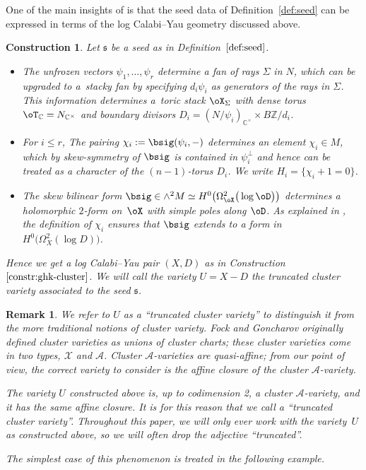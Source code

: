 \documentclass[10pt,a4paper]{amsart}
\numberwithin{equation}{section}
\newtheorem{Construction}[Theorem]{Construction}
\newtheorem{Remark}[Theorem]{Remark} }
\def\CC{\mathbb{C}}
\def\ZZ{\mathbb{Z}}
\newcommand\frs{\mathfrak{s}}
\begin{document}
One of the main insights of \cite{GHK2} is that the seed data of Definition~\ref{def:seed} can be expressed in terms of the log Calabi--Yau geometry discussed above.

\begin{Construction} \label{constr:ghk-cluster-seed}
 Let $\frs$ be a seed as in Definition~$\ref{def:seed}$.
\begin{itemize}\itemsep=0pt
 \item The unfrozen vectors $\psi_1,\dots, \psi_r$ determine a fan of rays $\Sigma$ in $N$, which can be upgraded to a~stacky fan by specifying $d_i\psi_i$ as generators of the rays in $\Sigma$. This information determines a~toric stack $\oX_\Sigma$ with dense torus $\oT_{\CC} = N_{\CC^\times}$ and boundary divisors $D_i = (N/\psi_i)_{\CC^\times}\allowbreak\times B\ZZ/d_i$.
 \item For $i\leq r$, The pairing $\chi_i := \bsig(\psi_i,-)$ determines an element $\chi_i\in M$, which by skew-symmetry of $\bsig$ is contained in $\psi_i^\perp$ and hence can be treated as a character of the $(n-1)$-torus $D_i$. We write $H_i = \{\chi_i + 1=0\}$.
 \item The skew bilinear form $\bsig\in \wedge^2M \simeq H^0\big(\Omega_{\oX}^2\big(\log\oD\big)\big)$ determines a holomorphic $2$-form on~$\oX$ with simple poles along $\oD$. As explained in {\rm \cite[Lemma 3.4]{HK-icm}}, the definition of $\chi_i$ ensures that $\bsig$ extends to a form in $H^0\big(\Omega_X^2(\log D)\big)$.
\end{itemize}
	Hence we get a log Calabi--Yau pair $(X,D)$ as in Construction~$\ref{constr:ghk-cluster}$. We will call the variety $U= X-D$ the {\em truncated cluster variety} associated to the seed $\frs$.
\end{Construction}

\begin{Remark}
 We refer to $U$ as a ``truncated cluster variety'' to distinguish it from the more traditional notions of cluster variety. Fock and Goncharov originally defined cluster varieties as unions of cluster charts; these cluster varieties come in two types, $\mathcal{X}$ and $\mathcal{A}$. Cluster $\mathcal{A}$-varieties are quasi-affine; from our point of view, the correct variety to consider is the affine closure of the cluster $\mathcal{A}$-variety. %

The variety $U$ constructed above is, up to codimension 2, a cluster $\mathcal{A}$-variety, and it has the same affine closure. It is for this reason that we call a ``truncated cluster variety''. Throughout this paper, we will only ever work with the variety~$U$ as constructed above, so we will often drop the adjective ``truncated''.

 The simplest case of this phenomenon is treated in the following example.
\end{Remark}
\end{document}
